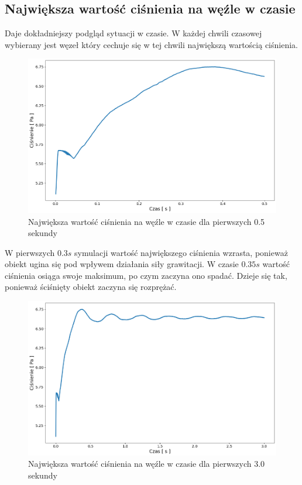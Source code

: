 \documentclass[12pt, letterpaper]{report}
\begin{document}
    \subsection{Największa wartość ciśnienia na węźle w czasie}
    Daje dokładniejszy podgląd sytuacji w czasie. W każdej chwili czasowej wybierany jest węzeł 
    który cechuje się w tej chwili największą wartością ciśnienia.

    \begin{figure}[H]
        \centering
        \includegraphics[width=17cm]{pressure_pressure_01}
        \caption{
            Największa wartość ciśnienia na węźle w czasie dla pierwszych 0.5 sekundy
        }
    \end{figure}

    W pierwszych $0.3s$ symulacji wartość największego ciśnienia wzrasta, ponieważ obiekt
    ugina się pod wpływem działania siły grawitacji. W czasie $0.35s$ wartość ciśnienia 
    osiąga swoje maksimum, po czym zaczyna ono spadać. Dzieje się tak, ponieważ 
    ściśnięty obiekt zaczyna się rozprężać.

    \begin{figure}[H]
        \centering
        \includegraphics[width=17cm]{pressure_pressure_02}
        \caption{
            Największa wartość ciśnienia na węźle w czasie dla pierwszych 3.0 sekundy
        }
    \end{figure}
\end{document}
